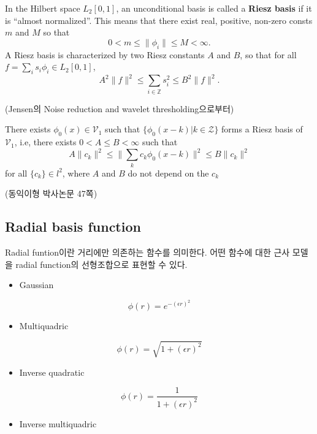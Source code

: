 \documentclass[b5paper,]{book}
\providecommand{\tightlist}{%
  \setlength{\itemsep}{0pt}\setlength{\parskip}{0pt}}
\theoremstyle{definition}
\theoremstyle{definition}
\theoremstyle{definition}
\theoremstyle{remark}
\begin{document}
In the Hilbert space \(L_{2}[0,1]\), an unconditional basis is called a
\textbf{Riesz basis} if it is ``almost normalized''. This means that
there exist real, positive, non-zero consts \(m\) and \(M\) so that
\[0 < m \leq \| \phi_{i}\|\leq M < \infty.\] A Riesz basis is
characterized by two Riesz constants \(A\) and \(B\), so that for all
\(f=\sum_{i}s_{i}\phi_{i}\in L_{2}[0,1]\),
\[A^{2}\| f \|^{2}\leq \sum_{i\in\mathbb{Z}}s_{i}^{2}\leq B^{2}\|f\|^{2}.\]

(Jensen의 Noise reduction and wavelet thresholding으로부터)

There exists \(\phi_{0}(x)\in\mathcal{V}_{1}\) such that
\(\{ \phi_{0}(x-k) | k\in\mathcal{Z} \}\) forms a Riesz basis of
\(\mathcal{V}_{1}\), i.e, there exists \(0< A \leq B <\infty\) such that
\[A \| c_{k}\|^{2} \leq \| \sum_{k}c_{k}\phi_{0}(x-k)\|^{2} \leq B \| c_{k} \|^{2}\]
for all \(\{c_{k}\}\in l^{2}\), where \(A\) and \(B\) do not depend on
the \(c_{k}\)

(동익이형 박사논문 47쪽)

\subsection{Radial basis function}\label{radial-basis-function}

Radial funtion이란 거리에만 의존하는 함수를 의미한다. 어떤 함수에 대한
근사 모델을 radial function의 선형조합으로 표현할 수 있다.

\begin{itemize}
\tightlist
\item
  Gaussian
\end{itemize}

\[\phi(r)=e^{-(\epsilon r)^{2}}\]

\begin{itemize}
\tightlist
\item
  Multiquadric
\end{itemize}

\[\phi(r)=\sqrt{1+(\epsilon r)^{2}}\]

\begin{itemize}
\tightlist
\item
  Inverse quadratic
\end{itemize}

\[\phi(r)=\frac{1}{1+(\epsilon r)^{2}}\]

\begin{itemize}
\tightlist
\item
  Inverse multiquadric
\end{itemize}
\end{document}
